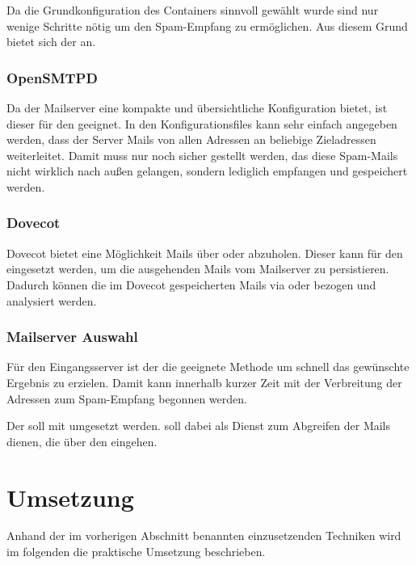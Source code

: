 \documentclass[a4paper,11pt,singlespacing]{article}
\begin{document}
			Da die Grundkonfiguration des Containers sinnvoll gewählt wurde sind nur wenige Schritte nötig um den Spam-Empfang zu ermöglichen.
			Aus diesem Grund bietet sich der  an.

		\subsubsection{OpenSMTPD}\label{sec:AuswahlLösungOpenSMTPD}
			Da der  Mailserver eine kompakte und übersichtliche Konfiguration bietet, ist dieser für den  geeignet.
			In den Konfigurationsfiles kann sehr einfach angegeben werden, dass der Server Mails von allen Adressen an beliebige Zieladressen weiterleitet.
			Damit muss nur noch sicher gestellt werden, das diese Spam-Mails nicht wirklich nach au{\ss}en gelangen, sondern lediglich empfangen und gespeichert werden.

		\subsubsection{Dovecot}\label{sec:AuswahlLösungDovecot}
			Dovecot bietet eine Möglichkeit Mails über  oder  abzuholen. \citep{dovecot}
			Dieser kann für den  eingesetzt werden, um die ausgehenden Mails vom Mailserver zu persistieren.
			Dadurch können die im Dovecot gespeicherten Mails via  oder  bezogen und analysiert werden.

		\subsubsection{Mailserver Auswahl}\label{sec:MailserverAuswahl}	
			Für den Eingangsserver ist der  die geeignete Methode um schnell das gewünschte Ergebnis zu erzielen.
			Damit kann innerhalb kurzer Zeit mit der Verbreitung der Adressen zum Spam-Empfang begonnen werden.

			Der  soll mit  umgesetzt werden.
			 soll dabei als Dienst zum Abgreifen der Mails dienen, die über den  eingehen.

\newpage


\section{Umsetzung}\label{sec:Umsetzung}
	Anhand der im vorherigen Abschnitt benannten einzusetzenden Techniken wird im folgenden die praktische Umsetzung beschrieben.
	
\end{document}
